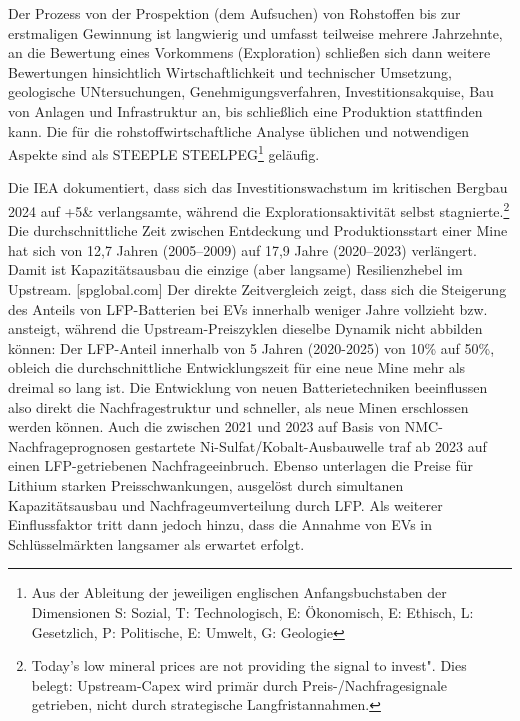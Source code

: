 \documentclass[12pt,a4paper,oneside]{book} %
\begin{document}
	Der Prozess von der Prospektion (dem Aufsuchen) von Rohstoffen bis zur erstmaligen Gewinnung ist langwierig und umfasst teilweise mehrere Jahrzehnte, an die Bewertung eines Vorkommens (Exploration) schließen sich dann weitere Bewertungen hinsichtlich Wirtschaftlichkeit und technischer Umsetzung, geologische UNtersuchungen, Genehmigungsverfahren, Investitionsakquise, Bau von Anlagen und Infrastruktur an, bis schließlich eine Produktion stattfinden kann. \autocite{Frenz 2025, S. 64} Die für die rohstoffwirtschaftliche Analyse üblichen und notwendigen Aspekte sind als STEEPLE\autocite{More, E: Probert, D.; Phaal, R.; An analysis of STEEPLE factors, PICMET 2015, S. 381-394.} STEELPEG\footnote{Aus der Ableitung der jeweiligen englischen Anfangsbuchstaben der Dimensionen S: Sozial, T: Technologisch, E: Ökonomisch, E: Ethisch, L: Gesetzlich, P: Politische, E: Umwelt, G: Geologie} geläufig.\autocites{Frenz 2025, S. 69}
	
	Die IEA\autocite{https://www.iea.org/reports/global-critical-minerals-outlook-2025/executive-summary} dokumentiert, dass sich das Investitionswachstum im kritischen Bergbau 2024 auf +5\& verlangsamte, während die Explorationsaktivität selbst stagnierte.\footnote{Today's low mineral prices are not providing the signal to invest". Dies belegt: Upstream-Capex wird primär durch Preis-/Nachfragesignale getrieben, nicht durch strategische Langfristannahmen.} Die durchschnittliche Zeit zwischen Entdeckung und Produktionsstart einer Mine hat sich von 12,7 Jahren (2005–2009) auf 17,9 Jahre (2020–2023) verlängert. Damit ist Kapazitätsausbau die einzige (aber langsame) Resilienzhebel im Upstream. [spglobal.com] Der direkte Zeitvergleich zeigt, dass sich die Steigerung des Anteils von LFP-Batterien bei EVs innerhalb weniger Jahre vollzieht bzw. ansteigt, während die Upstream-Preiszyklen dieselbe Dynamik nicht abbilden können: Der LFP-Anteil innerhalb von 5 Jahren (2020-2025) von 10\% auf 50\%, obleich die durchschnittliche Entwicklungszeit für eine neue Mine mehr als dreimal so lang ist. Die Entwicklung von neuen Batterietechniken beeinflussen also direkt die Nachfragestruktur und schneller, als neue Minen erschlossen werden können.\autocite{https://www.iea.org/reports/global-critical-minerals-outlook-2025/executive-summary} Auch die zwischen 2021 und 2023 auf Basis von NMC-Nachfrageprognosen gestartete Ni-Sulfat/Kobalt-Ausbauwelle traf ab 2023 auf einen LFP-getriebenen Nachfrageeinbruch. Ebenso unterlagen die Preise für Lithium starken Preisschwankungen, ausgelöst durch simultanen Kapazitätsausbau und Nachfrageumverteilung durch LFP. Als weiterer Einflussfaktor tritt dann jedoch hinzu, dass die Annahme von EVs in Schlüsselmärkten langsamer als erwartet erfolgt.\autocites{Restrepo, Uribe & Guillén (Frontiers in Energy Research, 2023)}{https://www.fastmarkets.com/insights/five-takeaways-from-fastmarkets-lithium-supply-and-battery-raw-materials-conference-2025/} 
	
\end{document}
